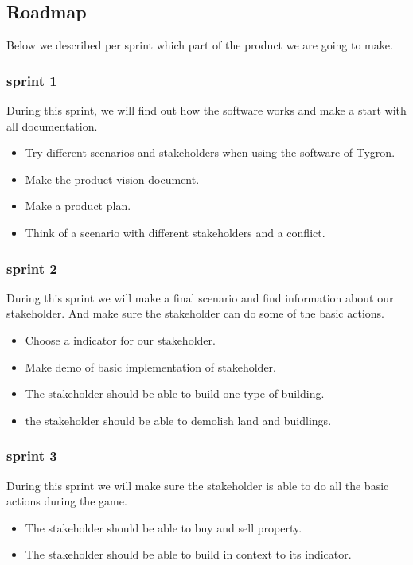 \subsection{Roadmap}
Below we described per sprint which part of the product we are going to make. \newline

\subsubsection{sprint 1}
During this sprint, we will find out how the software works and make a start with all documentation.
\begin{itemize}
	\item Try different scenarios and stakeholders when using the software of Tygron.
	\item Make the product vision document.
	\item Make a product plan.
	\item Think of a scenario with different stakeholders and a conflict.
\end{itemize}

\subsubsection{sprint 2}
During this sprint we will make a final scenario and find information about our stakeholder. And make sure the stakeholder can do some of the basic actions.
\begin{itemize}
	\item Choose a indicator for our stakeholder.
	\item Make demo of basic implementation of stakeholder.
	\item The stakeholder should be able to build one type of building.
	\item the stakeholder should be able to demolish land and buidlings.
\end{itemize}

\subsubsection{sprint 3}
During this sprint we will make sure the stakeholder is able to do all the basic actions during the game.
\begin{itemize}
	\item The stakeholder should be able to buy and sell property.
	\item The stakeholder should be able to build in context to its indicator.
\end{itemize}

